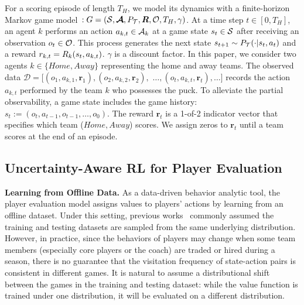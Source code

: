 \documentclass{article}
\newcommand{\horizon}{T_{H}}
\newcommand{\state}{s}
\newcommand{\observation}{o}
\newcommand{\action}{a}
\newcommand{\transition}{t}
\newcommand{\reward}{r}
\newcommand{\agentIndex}{k}
\newcommand{\gameIndex}{j}
\newcommand{\dataset}{\mathcal{D}}
\begin{document}
For a scoring episode of length $\horizon$, we model its dynamics with a finite-horizon Markov game model~\cite{Littman1994MarkovGame}$: G=(\mathcal{\MakeUppercase{\state}}, \boldsymbol{\mathcal{\MakeUppercase{\action}}}, P_{\mathcal{\MakeUppercase{\transition}}}, \boldsymbol{\MakeUppercase{\reward}}, \mathcal{\MakeUppercase{\observation}},\horizon,\gamma)$. 
At a time step $t\in[0,\horizon]$, an agent $\agentIndex$ performs an action $\action_{\agentIndex,t} \in \mathcal{\MakeUppercase{\action}}_{\agentIndex}$ at a game state $\state_{t} \in \mathcal{\MakeUppercase{\state}}$ after receiving an observation $\observation_{t} \in \mathcal{\MakeUppercase{\observation}}$. 
This process generates the next state $\state_{t+1} \sim P_{\mathcal{\MakeUppercase{\transition}}}(\cdot|\state_t, \action_t)$ and a reward
$\reward_{k,t}=\MakeUppercase{\reward}_{\agentIndex}(\state_{t},\action_{\agentIndex,t})$. $\gamma$ is a discount factor.
In this paper, we consider two agents $\agentIndex\in\{Home, Away\}$ representing the home and away teams. The observed data $\dataset=[(\observation_1,\action_{\agentIndex,1},\boldsymbol{\reward}_{1}),(\observation_2,\action_{\agentIndex,2},\boldsymbol{\reward}_{2}),$ $\ldots,(\observation_t,\action_{\agentIndex,t},\boldsymbol{\reward}_{t}),\ldots]$ records the action $\action_{\agentIndex,t}$ performed by the team $\agentIndex$ who possesses the puck.  To alleviate the partial observability, a game state includes the game history: $\state_{t} := (\observation_t,\action_{t-1},\observation_{t-1},\ldots,\observation_{0})$. The reward $\boldsymbol{\reward}_{t}$ is a 1-of-2 indicator vector that specifies which team ($Home, Away$) scores. We assign zeros to $\boldsymbol{\reward}_{t}$ until a team scores at the end of an episode.%
\subsection{Uncertainty-Aware RL for Player Evaluation}\label{subsec:offline-problem}
\noindent\textbf{Learning from Offline Data.} As a data-driven behavior analytic tool, the player evaluation model assigns values to players' actions by learning from an offline dataset. Under this setting, previous works~\cite{Routley2015Markov,Liu2018DRL,Liu2020soccer,Decroos2019Actions} commonly assumed the training and testing datasets are sampled from the same underlying distribution. However, in practice, since the behaviors of players may change when some team members (especially core players or the coach) are traded or hired during a season, there is no guarantee that the visitation frequency of state-action pairs is consistent in different games. It is natural to assume a distributional shift between the games in the training and testing dataset: while the value function is trained under one distribution, it will be evaluated on a different distribution.
\end{document}
